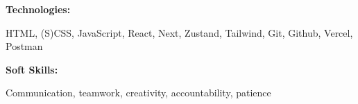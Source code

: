 \documentclass[9pt]{developercv} %
\begin{document}
\begin{minipage}[t]{\textwidth}
    \vspace{-6pt}
    \vspace{1mm}

    \begin{minipage}[t]{1\textwidth}
        \textbf{Technologies:}
    \end{minipage}
   
    \vspace{1mm}
    \begin{minipage}[t]{0.73\textwidth}
      HTML, (S)CSS, JavaScript, React, Next, Zustand, Tailwind, Git, Github, Vercel, Postman
    \end{minipage}
    \vspace{2mm}
    
    \begin{minipage}[t]{1\textwidth}
        \textbf{Soft Skills:}
    \end{minipage}
   
    \vspace{0.5mm}
    \begin{minipage}[t]{0.73\textwidth}
      Communication, teamwork, creativity, accountability, patience
    \end{minipage}
    
\end{minipage}
 \vspace{2mm}
\end{document}
